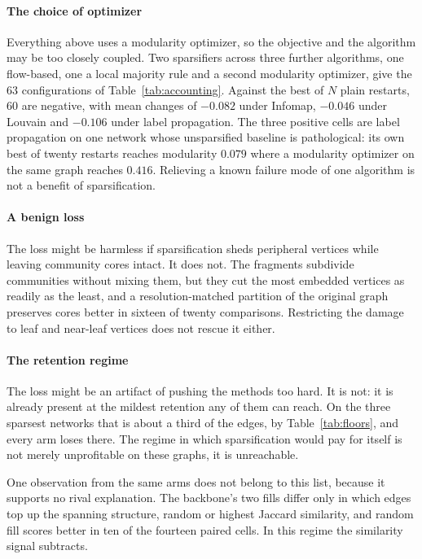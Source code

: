 \paragraph{The choice of optimizer}
Everything above uses a modularity optimizer, so the objective and the algorithm
may be too closely coupled. Two sparsifiers across three further algorithms, one
flow-based, one a local majority rule and a second modularity optimizer, give the
63 configurations of Table~\ref{tab:accounting}. Against the best of $N$ plain
restarts, 60 are negative, with mean changes of $-0.082$ under Infomap, $-0.046$
under Louvain and $-0.106$ under label propagation. The three positive cells are
label propagation on one network whose unsparsified baseline is pathological: its
own best of twenty restarts reaches modularity $0.079$ where a modularity
optimizer on the same graph reaches $0.416$. Relieving a known failure mode of one
algorithm is not a benefit of sparsification.

\paragraph{A benign loss}
The loss might be harmless if sparsification sheds peripheral vertices while
leaving community cores intact. It does not. The fragments subdivide communities
without mixing them, but they cut the most embedded vertices as readily as the
least, and a resolution-matched partition of the original graph preserves cores
better in sixteen of twenty comparisons. Restricting the damage to leaf and
near-leaf vertices does not rescue it either.

\paragraph{The retention regime}
The loss might be an artifact of pushing the methods too hard. It is not: it is
already present at the mildest retention any of them can reach. On the three
sparsest networks that is about a third of the edges, by Table~\ref{tab:floors},
and every arm loses there. The regime in which sparsification would pay for itself
is not merely unprofitable on these graphs, it is unreachable.

One observation from the same arms does not belong to this list, because it
supports no rival explanation. The backbone's two fills differ only in which edges
top up the spanning structure, random or highest Jaccard similarity, and random
fill scores better in ten of the fourteen paired cells. In this regime the
similarity signal subtracts.

